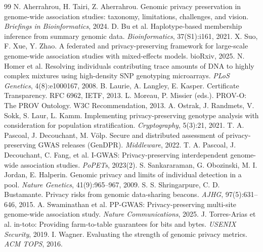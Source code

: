 \documentclass[11pt]{article}
\begin{document}

\begin{thebibliography}{99}
 N. Aherrahrou, H. Tairi, Z. Aherrahrou. Genomic privacy preservation in genome-wide association studies: taxonomy, limitations, challenges, and vision. \emph{Briefings in Bioinformatics}, 2024.
 D. Bu et al. Haplotype-based membership inference from summary genomic data. \emph{Bioinformatics}, 37(S1):i161, 2021.
 X. Suo, F. Xue, Y. Zhao. A federated and privacy-preserving framework for large-scale genome-wide association studies with mixed-effects models. bioRxiv, 2025.
 N. Homer et al. Resolving individuals contributing trace amounts of DNA to highly complex mixtures using high-density SNP genotyping microarrays. \emph{PLoS Genetics}, 4(8):e1000167, 2008.
 B. Laurie, A. Langley, E. Kasper. Certificate Transparency. RFC 6962, IETF, 2013.
 L. Moreau, P. Missier (eds.). PROV-O: The PROV Ontology. W3C Recommendation, 2013.
 A. Ostrak, J. Randmets, V. Sokk, S. Laur, L. Kamm. Implementing privacy-preserving genotype analysis with consideration for population stratification. \emph{Cryptography}, 5(3):21, 2021.
 T. A. Pascoal, J. Decouchant, M. V\"olp. Secure and distributed assessment of privacy-preserving GWAS releases (GenDPR). \emph{Middleware}, 2022.
 T. A. Pascoal, J. Decouchant, C. Fang, et al. I-GWAS: Privacy-preserving interdependent genome-wide association studies. \emph{PoPETs}, 2023(2).
 S. Sankararaman, G. Obozinski, M. I. Jordan, E. Halperin. Genomic privacy and limits of individual detection in a pool. \emph{Nature Genetics}, 41(9):965--967, 2009.
 S. S. Shringarpure, C. D. Bustamante. Privacy risks from genomic data-sharing beacons. \emph{AJHG}, 97(5):631--646, 2015.
 A. Swaminathan et al. PP-GWAS: Privacy-preserving multi-site genome-wide association study. \emph{Nature Communications}, 2025.
 J. Torres-Arias et al. in-toto: Providing farm-to-table guarantees for bits and bytes. \emph{USENIX Security}, 2019.
 I. Wagner. Evaluating the strength of genomic privacy metrics. \emph{ACM TOPS}, 2016.

\end{thebibliography}
\end{document}

